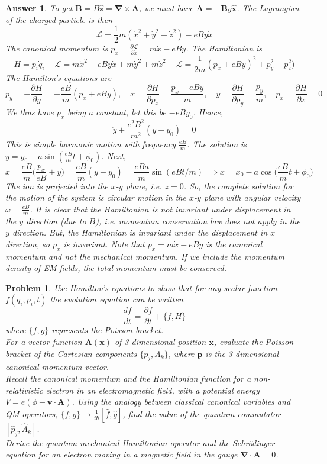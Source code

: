 \documentclass[a4paper]{article}
\newtheorem{ans}{Answer}[section]
\theoremstyle{new}
\newtheorem{qns}{Problem}[section]
\begin{document}
\begin{ans}
To get $\mathbf{B}=B\mathbf{\hat{z}}=\boldsymbol{\nabla}\times\mathbf{A}$, we must have $\mathbf{A}=-\mathbf{B}y\mathbf{\hat{x}}$. The Lagrangian of the charged particle is then
$$\mathcal{L}=\frac{1}{2}m(\dot{x}^2+\dot{y}^2+\dot{z}^2)-eBy\dot{x}$$
The canonical momentum is $p_x=\frac{\partial\mathcal{L}}{\partial\dot{x}}=m\dot{x}-eBy$. The Hamiltonian is 
$$H=p_i\dot{q}_i-\mathcal{L}=m\dot{x}^2-eBy\dot{x}+m\dot{y}^2+m\dot{z}^2-\mathcal{L}=\frac{1}{2m}(p_x+eBy)^2+p_y^2+p_z^2)$$
The Hamilton's equations are
$$\dot{p}_y=-\frac{\partial H}{\partial y}=-\frac{eB}{m}(p_x+eBy),\quad\dot{x}=\frac{\partial H}{\partial p_x}=\frac{p_x+eBy}{m},\quad\dot{y}=\frac{\partial H}{\partial p_y}=\frac{p_y}{m},\quad\dot{p}_x=\frac{\partial H}{\partial x}=0$$
We thus have $p_x$ being a constant, let this be $-eBy_0$. Hence,
$$\ddot{y}+\frac{e^2B^2}{m^2}(y-y_0)=0$$
This is simple harmonic motion with frequency $\frac{eB}{m}$. The solution is $y=y_0+a\sin(\frac{eB}{m}t+\phi_0)$. Next, 
$$\dot{x}=\frac{eB}{m}\bigg(\frac{p_x}{eB}+y\bigg)=\frac{eB}{m}(y-y_0)=\frac{eBa}{m}\sin(eBt/m)\implies x=x_0-a\cos\bigg(\frac{eB}{m}t+\phi_0\bigg)$$
The ion is projected into the $x$-$y$ plane, i.e. $z=0$. So, the complete solution for the motion of the system is circular motion in the $x$-$y$ plane with angular velocity $\omega=\frac{eB}{m}$. It is clear that the Hamiltonian is not invariant under displacement in the $y$ direction (due to $B$), i.e. momentum conservation law does not apply in the $y$ direction. But, the Hamiltonian is invariant under the displacement in $x$ direction, so $p_x$ is invariant. Note that $p_x=m\dot{x}-eBy$ is the canonical momentum and not the mechanical momentum. If we include the momentum density of EM fields, the total momentum must be conserved.
\end{ans}
\begin{qns}
Use Hamilton’s equations to show that for any scalar function $f(q_i, p_i,t)$ the evolution equation can be written
$$\frac{df}{dt}=\frac{\partial f}{\partial t}+\{f,H\}$$
where $\{f,g\}$ represents the Poisson bracket.\\[5pt]
For a vector function $\mathbf{A}(\mathbf{x})$ of 3-dimensional position $\mathbf{x}$, evaluate the Poisson bracket of the Cartesian components $\{p_j,A_k\}$, where $\mathbf{p}$ is the 3-dimensional canonical momentum vector.\\[5pt]
Recall the canonical momentum and the Hamiltonian function for a non-relativistic electron in an electromagnetic field, with a potential energy $V=e(\phi-\mathbf{v}\cdot\mathbf{A})$. Using the analogy between classical canonical variables and QM operators, $\{f,g\}\rightarrow\frac{1}{i\hbar}[\hat{f},\hat{g}]$, find the value of the quantum commutator $[\hat{p}_j,\hat{A}_k]$.\\[5pt]
Derive the quantum-mechanical Hamiltonian operator and the Schr\"{o}dinger equation for an electron moving in a magnetic field in the gauge $\boldsymbol{\nabla}\cdot\mathbf{A}=0$.
\end{qns}
\end{document}
